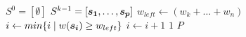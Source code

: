 \begin{algorithmic}[1]
    \State $S^0 = [\emptyset ]$
      \State $S^{k-1} = [\boldsymbol{s_1}, \ldots, \boldsymbol{s_p}]$
      \State $w_{left} \gets (w_{k} + \ldots + w_n)$
      \State $i \gets min\{i \;| \; w(\boldsymbol{s_i}) \geq w_{left}\}$
        \State $i \gets i + 1$
      \EndWhile
      \State $1$
    \EndFor
  \State \Return $P$
  \EndFunction
\end{algorithmic}
